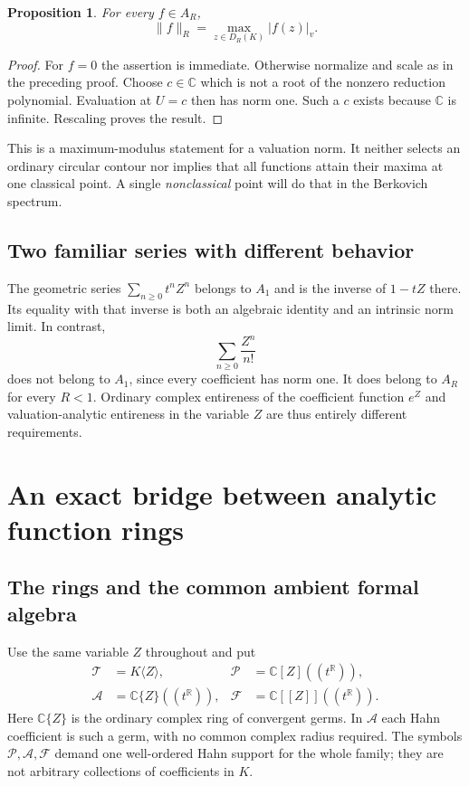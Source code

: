 \documentclass[11pt,a4paper]{article}
\numberwithin{equation}{section}
\newtheorem{proposition}[theorem]{Proposition}
\theoremstyle{definition}
\theoremstyle{remark}
\newcommand{\C}{\mathbb C}
\newcommand{\R}{\mathbb R}
\newcommand{\TT}{\mathcal T}
\newcommand{\PP}{\mathcal P}
\newcommand{\Ag}{\mathcal A}
\newcommand{\FF}{\mathcal F}
\newcommand{\vabs}[1]{\lvert#1\rvert_v}
\newcommand{\Gauss}[2]{\lVert#1\rVert_{#2}}
\begin{document}
\begin{proposition}\label{prop:supnorm}
For every $f\in A_R$,
\[
 \Gauss fR=\max_{z\in D_R(K)}\vabs{f(z)}.
\]
\end{proposition}
\begin{proof}
For $f=0$ the assertion is immediate. Otherwise normalize and scale as in the
preceding proof. Choose $c\in\C$ which is not a
root of the nonzero reduction polynomial. Evaluation at $U=c$ then has norm
one. Such a $c$ exists because $\C$ is infinite. Rescaling proves the result.
\end{proof}

This is a maximum-modulus statement for a valuation norm. It neither selects an
ordinary circular contour nor implies that all functions attain their maxima at
one classical point. A single \emph{nonclassical} point will do that in the
Berkovich spectrum.

\subsection{Two familiar series with different behavior}
The geometric series $\sum_{n\ge0}t^nZ^n$ belongs to $A_1$ and is the inverse
of $1-tZ$ there. Its equality with that inverse is both an algebraic identity and
an intrinsic norm limit. In contrast,
\[
 \sum_{n\ge0}\frac{Z^n}{n!}
\]
does not belong to $A_1$, since every coefficient has norm one. It does belong
to $A_R$ for every $R<1$. Ordinary complex entireness of the coefficient
function $e^Z$ and valuation-analytic entireness in the variable $Z$ are thus
entirely different requirements.

\section{An exact bridge between analytic function rings}
\label{sec:bridge}

\subsection{The rings and the common ambient formal algebra}
Use the same variable $Z$ throughout and put
\begin{align*}
 \TT&=K\langle Z\rangle,&
 \PP&=\C[Z]((t^\R)),\\
 \Ag&=\C\{Z\}((t^\R)),&
 \FF&=\C[[Z]]((t^\R)).
\end{align*}
Here $\C\{Z\}$ is the ordinary complex ring of convergent germs. In $\Ag$
each Hahn coefficient is such a germ, with no common complex radius required.
The symbols $\PP,\Ag,\FF$ demand one well-ordered Hahn support for the whole
family; they are not arbitrary collections of coefficients in $K$.
\end{document}
